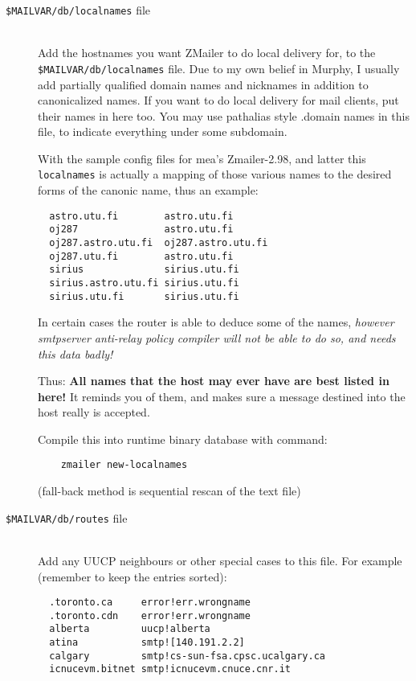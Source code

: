 \begin{description}
\item[{\tt \$MAILVAR/db/localnames} file] \mbox{} \\

Add the hostnames you want ZMailer to do local delivery for, to the
{\tt \$MAILVAR/db/localnames} file.  Due to my own belief in Murphy,
I usually add partially qualified domain names and nicknames in
addition to canonicalized names.  If you want to do local delivery
for mail clients, put their names in here too.  You may use pathalias 
style .domain names in this file, to indicate everything under some
subdomain.

With the sample config files for mea's Zmailer-2.98, and latter
this {\tt localnames} is actually a mapping of those various names to
the desired forms of the canonic name, thus an example:
\begin{verbatim}
  astro.utu.fi        astro.utu.fi
  oj287               astro.utu.fi
  oj287.astro.utu.fi  oj287.astro.utu.fi
  oj287.utu.fi        astro.utu.fi
  sirius              sirius.utu.fi
  sirius.astro.utu.fi sirius.utu.fi
  sirius.utu.fi       sirius.utu.fi
\end{verbatim}

In certain cases the router is able to deduce some of the names,
{\em however smtpserver anti-relay policy compiler will not be able
 to do so, and needs this data badly!}

Thus: {\bf All names that the host may ever have are best listed in here!}
It reminds you of them, and makes sure a message destined into the host
really is accepted.

Compile this into runtime binary database with command:
\begin{verbatim}
    zmailer new-localnames
\end{verbatim}
(fall-back method is sequential rescan of the text file)

\item[{\tt \$MAILVAR/db/routes} file] \mbox{} \\

Add any UUCP neighbours or other special cases to this file.  For
example (remember to keep the entries sorted):
\begin{verbatim}
  .toronto.ca     error!err.wrongname
  .toronto.cdn    error!err.wrongname
  alberta         uucp!alberta
  atina           smtp![140.191.2.2]
  calgary         smtp!cs-sun-fsa.cpsc.ucalgary.ca
  icnucevm.bitnet smtp!icnucevm.cnuce.cnr.it
\end{verbatim}


\end{description}
